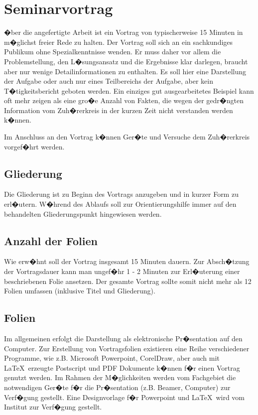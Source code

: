 \chapter{Seminarvortrag}

�ber die angefertigte Arbeit ist ein Vortrag von typischerweise 15 Minuten in m�glichst freier Rede
zu halten. Der Vortrag soll sich an ein sachkundiges Publikum ohne Spezialkenntnisse wenden. Er
muss daher vor allem die Problemstellung, den L�sungsansatz und die Ergebnisse klar darlegen,
braucht aber nur wenige Detailinformationen zu enthalten. Es soll hier eine Darstellung der Aufgabe
oder auch nur eines Teilbereichs der Aufgabe, aber kein T�tigkeitsbericht geboten werden. Ein
einziges gut ausgearbeitetes Beispiel kann oft mehr zeigen als eine gro�e Anzahl von Fakten, die
wegen der gedr�ngten Information vom Zuh�rerkreis in der kurzen Zeit nicht verstanden werden
k�nnen.

Im Anschluss an den Vortrag k�nnen Ger�te und Versuche dem Zuh�rerkreis vorgef�hrt werden.

\section{Gliederung}
Die Gliederung ist zu Beginn des Vortrags anzugeben und in kurzer Form zu erl�utern. W�hrend des
Ablaufs soll zur Orientierungshilfe immer auf den behandelten Gliederungspunkt hingewiesen werden.

\section{Anzahl der Folien}
Wie erw�hnt soll der Vortrag insgesamt 15 Minuten dauern. Zur Absch�tzung der Vortragsdauer kann
man ungef�hr 1 - 2 Minuten zur Erl�uterung einer beschriebenen Folie ansetzen. Der gesamte Vortrag
sollte somit nicht mehr als 12 Folien umfassen (inklusive Titel und Gliederung).

\section{Folien}
Im allgemeinen erfolgt die Darstellung als elektronische Pr�sentation auf den Computer. Zur
Erstellung von Vortragsfolien existieren eine Reihe verschiedener Programme, wie z.B. Microsoft
Powerpoint, CorelDraw, aber auch mit \LaTeX\  erzeugte Postscript und PDF Dokumente k�nnen f�r
einen Vortrag genutzt werden. Im Rahmen der M�glichkeiten werden vom Fachgebiet die notwendigen
Ger�te f�r die Pr�sentation (z.B. Beamer, Computer) zur Verf�gung gestellt. Eine Designvorlage f�r
Powerpoint und \LaTeX\  wird vom Institut zur Verf�gung gestellt.

